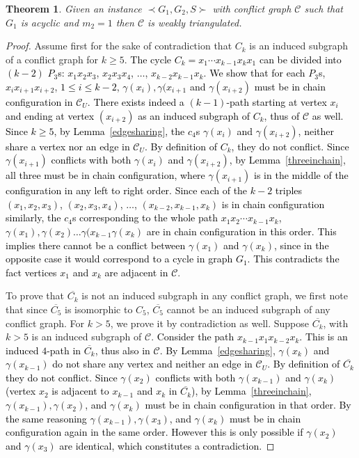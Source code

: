 \documentclass[final]{dmtcs-episciences}
\newtheorem{theorem}{Theorem}
\newcommand\mar[1]{\textcolor{black}{#1}}
\begin{document}
\begin{theorem}
\label{th:weaklytriangl}
Given an instance $\prec G_1,G_2,S \succ$ with conflict graph $\mathcal{C}$ such that $G_1$ is acyclic and $m_2=1$ then $\mathcal{C}$ is weakly triangulated. 
\end{theorem}
\begin{proof} 
Assume first for the sake of contradiction that $C_k$  is an induced subgraph of a conflict graph for $k\geq 5$.
\mar{The cycle $C_k=x_1\cdots x_{k-1}x_kx_1$ can be divided into $(k-2)$ $P_3$s: $x_1x_2x_3$, $x_2x_3x_4$, $\ldots$, $x_{k-2}x_{k-1}x_k$. 
We show that for each $P_3$s, $x_ix_{i+1}x_{i+2}$, $1\leq i\leq k-2$, $\gamma(x_i), \gamma(x_{i+1}$ and $\gamma(x_{i+2})$ must be in chain configuration in $\mathcal{C}_U$. There exists indeed a $(k-1)$-path starting at vertex $x_i$ and ending 
at vertex $(x_{i+2})$ as an induced subgraph of $C_k$, thus of $\mathcal{C}$ as well. Since $k\geq 5$, by Lemma~\ref{edgesharing}, 
the $c_4$s $\gamma(x_i)$ and $\gamma(x_{i+2})$, neither   
share a vertex nor an edge in $\mathcal{C}_U$. By definition of $C_k$, they do not conflict. 
Since $\gamma(x_{i+1})$ conflicts with both $\gamma(x_i)$ and $\gamma(x_{i+2})$, by Lemma~\ref{threeinchain}, all three must be in chain 
configuration, where $\gamma(x_{i+1})$ is in the middle of the configuration in any left to right order. 
Since each of the $k-2$ triples $(x_1,x_2,x_3)$, $(x_2,x_3,x_4)$, $\ldots$, $(x_{k-2},x_{k-1},x_k)$ is in chain configuration similarly,
the $c_4$s corresponding to the whole path $x_1x_2\cdots x_{k-1}x_k$, $\gamma(x_1), \gamma(x_2) \ldots \gamma(x_{k-1}\gamma(x_k)$ are in chain configuration in this order. This implies there cannot be a conflict between $\gamma(x_1)$ and 
 $\gamma(x_k)$, since in the opposite case it would correspond to a cycle in graph $G_1$. This contradicts the fact vertices $x_1$ and $x_k$ are adjacent in $\mathcal{C}$}. 
 
To prove that $\overline{C_k}$ is not an induced subgraph in any conflict graph, we first note that
since $\overline{C_5}$ is isomorphic to $C_5$, $\overline{C_5}$ cannot be an induced subgraph 
of any conflict graph. For $k>5$, we prove it by contradiction as well. Suppose $\overline{C_k}$, with $k>5$ is an induced subgraph of $\mathcal{C}$.
\mar{Consider the path $x_{k-1}x_1x_{k-2}x_k$. This is an induced $4$-path 
in $\overline{C_k}$, thus also in $\mathcal{C}$. By Lemma~\ref{edgesharing}, $\gamma(x_k)$ and $\gamma(x_{k-1})$ do not share any vertex and neither                                                                         an edge in $\mathcal{C}_U$. By definition of $\overline{C_k}$ they do not conflict.
Since $\gamma(x_2)$  
conflicts with both $\gamma(x_{k-1})$ and $\gamma(x_k)$ (vertex $x_2$ is adjacent to $x_{k-1}$ and $x_k$ in $\overline{C_k}$), by Lemma~\ref{threeinchain},
$\gamma(x_{k-1}), \gamma(x_2)$, and $\gamma(x_k)$ must be in chain configuration in that order. By the same reasoning 
$\gamma(x_{k-1}), \gamma(x_3)$, and $\gamma(x_k)$ must be in chain configuration again in the same order. However this is 
only possible if  $\gamma(x_2)$ and $\gamma(x_3)$ are identical, which constitutes a contradiction.}   
\end{proof}
\end{document}

